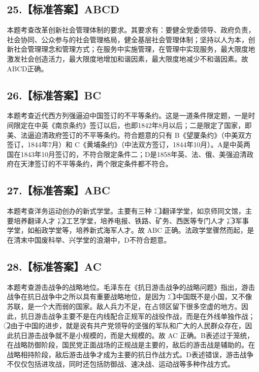 \documentclass[UTF8,11pt]{ctexart}
\begin{document}
\subsection*{25.【标准答案】ABCD}

本题考查改革创新社会管理体制的要求。其要求有：要健全党委领导、政府负责，社会协同、公众参与的社会管理格局，健全基层社会管理体制；坚持以人为本，创新社会管理理念和管理方式；在服务中实施管理，在管理中实现服务，最大限度地激发社会创造活力，最大限度地增加和谐因素，最大限度地减少不和谐因素。故 ABCD正确。


\subsection*{26.【标准答案】BC}

本题考查近代西方列强逼迫中国签订的不平等条约。这是一道条件限定题，一是时间限定在中英《南京条约》签订以后，也即1842年8月以后；二是限定了国家，即美、法逼迫清政府签订的不平等条约。符合题意的只有 B《望厦条约》（中美双方签订，1844年7月）和 C《黄埔条约》（中法双方签订，1844年10月）。A是中英两国在1843年10月签订的，不符合限定条件二；D是1858年英、法、俄、美强迫清政府在天津签订的不平等条约，两个限定条件都不符合。


\subsection*{27.【标准答案】ABC}

本题考查洋务运动创办的新式学堂。主要有三种：\textcircled{1}翻译学堂，如京师同文馆，主要培养翻译人才；\textcircled{2}工艺学堂，培养电报、铁路、矿务、西医等专门人才；\textcircled{3}军事学堂，如船政学堂等，培养新式海军人才。故 ABC 正确。法政学堂骤然而起，是在清末中国废科举、兴学堂的浪潮中，D不符合题意。


\subsection*{28.【标准答案】AC}

本题考查游击战争的战略地位。毛泽东在《抗日游击战争的战略问题》指出，游击战争在抗日战争中之所以具有重要战略地位，是因为：\textcircled{1}中国既不是小国，又不像苏联，是一个大而弱的国家。敌人兵力不足，在占领区留下很多空虚的地方。因此，抗日游击战争主要不是在内线配合正规军的战役作战，而是在外线单独作战；\textcircled{2}由于中国的进步，就是说有共产党领导的坚强的军队和广大的人民群众存在，因此抗日游击战争就不是小规模的，而是大规模的。故 AC 正确。B表述过于笼统，在战略防御阶段，国民党正面战场的正规战是主要的，敌后的游击战是辅助的。在战略相持阶段，敌后游击战争才成为主要的抗日作战方式。D表述错误，游击战争不仅仅包括进攻战，同时还包括防御战、速决战、运动战等多种作战方式。
\end{document}
